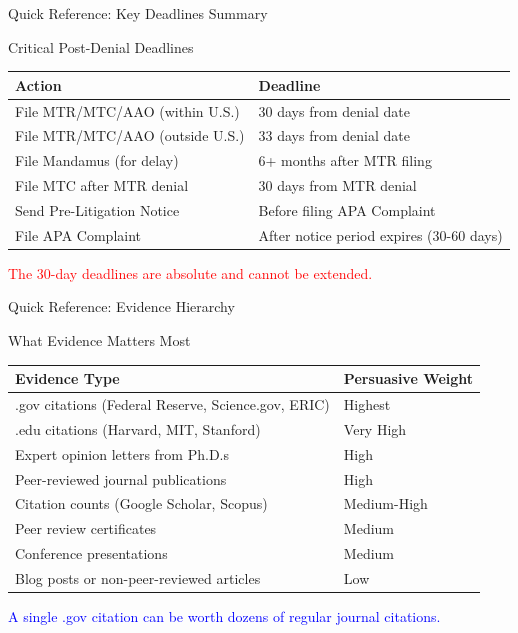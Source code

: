 \documentclass[11pt]{beamer}
\begin{document}
	\begin{frame}{Quick Reference: Key Deadlines Summary}
		\scriptsize
		\begin{block}{Critical Post-Denial Deadlines}
			\centering
			\begin{tabular}{|p{5cm}|p{4cm}|}
				\hline
				\textbf{Action} & \textbf{Deadline} \\
				\hline
				File MTR/MTC/AAO (within U.S.) & 30 days from denial date \\
				\hline
				File MTR/MTC/AAO (outside U.S.) & 33 days from denial date \\
				\hline
				File Mandamus (for delay) & 6+ months after MTR filing \\
				\hline
				File MTC after MTR denial & 30 days from MTR denial \\
				\hline
				Send Pre-Litigation Notice & Before filing APA Complaint \\
				\hline
				File APA Complaint & After notice period expires (30-60 days) \\
				\hline
			\end{tabular}
			\vspace{0.2cm}
			\textcolor{red}{The 30-day deadlines are absolute and cannot be extended.}
		\end{block}
	\end{frame}
	
	\begin{frame}{Quick Reference: Evidence Hierarchy}
		\scriptsize
		\begin{block}{What Evidence Matters Most}
			\centering
			\begin{tabular}{|p{5cm}|p{4cm}|}
				\hline
				\textbf{Evidence Type} & \textbf{Persuasive Weight} \\
				\hline
				.gov citations (Federal Reserve, Science.gov, ERIC) & Highest \\
				\hline
				.edu citations (Harvard, MIT, Stanford) & Very High \\
				\hline
				Expert opinion letters from Ph.D.s & High \\
				\hline
				Peer-reviewed journal publications & High \\
				\hline
				Citation counts (Google Scholar, Scopus) & Medium-High \\
				\hline
				Peer review certificates & Medium \\
				\hline
				Conference presentations & Medium \\
				\hline
				Blog posts or non-peer-reviewed articles & Low \\
				\hline
			\end{tabular}
			\vspace{0.2cm}
			\textcolor{blue}{A single .gov citation can be worth dozens of regular journal citations.}
		\end{block}
	\end{frame}
	
\end{document}
